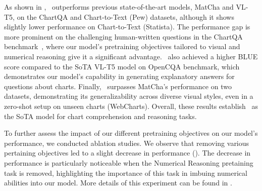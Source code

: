 As shown in , \model\ outperforms previous state-of-the-art models, MatCha and VL-T5, on the ChartQA and Chart-to-Text (Pew) datasets, although it shows slightly lower performance on Chart-to-Text (Statista). 
The performance gap is more prominent on the challenging human-written questions in the ChartQA benchmark~\cite{masry-etal-2022-chartqa}, where our model's pretraining objectives tailored to visual and numerical reasoning give it a significant advantage.
\model\ also achieved a higher BLUE score compared to the SoTA VL-T5 model on OpenCQA benchmark, which demonstrates our model's capability in generating explanatory answers for questions about charts. Finally, \model\ surpasses MatCha's performance on two datasets, demonstrating its generalizability across diverse visual styles, even in a zero-shot setup on unseen charts (WebCharts). 
Overall, these results establish \model\ as the SoTA model for chart comprehension and reasoning tasks.



To further assess the impact of our different pretraining objectives on our model's performance, we conducted ablation studies. We observe that removing various pertaining objectives led to a slight decrease in performance (). The decrease in performance is particularly noticeable when the Numerical Reasoning pretaining task is removed, highlighting the importance of this task in imbuing numerical abilities into our model.  More details of this experiment can be found in .



\begin{table}[t]
 \setlength\extrarowheight{2pt}
 \centering
 
 
 \vspace{-3mm}
 \caption{
  \small{Average Informativeness scores from Human and ChatGPT-based evaluation. 
  }
  \vspace{-4mm}
 }
 
 \label{tab:informativeness}
\end{table}
\vspace{-1mm}
